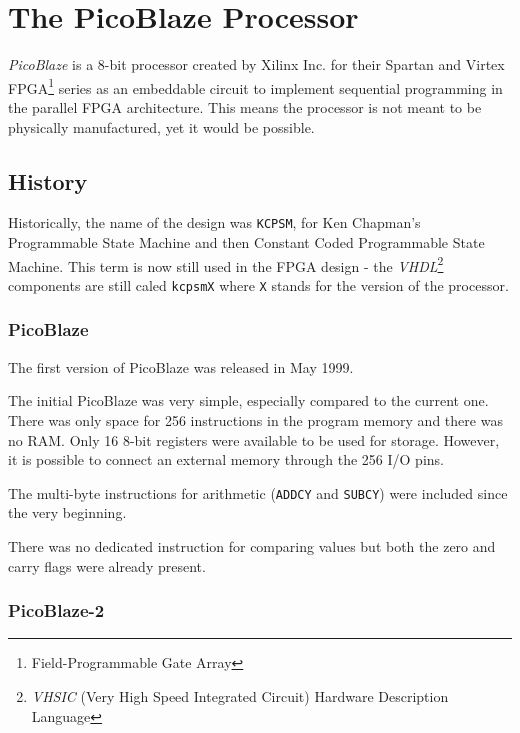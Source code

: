\chapter{The PicoBlaze Processor}\label{processor}

\emph{PicoBlaze} is a 8-bit processor created by Xilinx Inc. for their Spartan and Virtex FPGA\footnote{Field-Programmable Gate Array} series as an embeddable circuit to implement sequential programming in the parallel FPGA architecture. This means the processor is not meant to be physically manufactured, yet it would be possible.\cite{PicoBlazeWeb}

    \section{History}

    Historically, the name of the design was \texttt{KCPSM}, for Ken Chapman's Programmable State Machine and then Constant Coded Programmable State Machine. This term is now still used in the FPGA design - the \emph{VHDL}\footnote{\emph{VHSIC} (Very High Speed Integrated Circuit) Hardware Description Language} components are still caled \texttt{kcpsmX} where \texttt{X} stands for the version of the processor.\cite{DSPwFPGA}

        \subsection{PicoBlaze}

        The first version of PicoBlaze was released in May 1999.

        The initial PicoBlaze was very simple, especially compared to the current one. There was only space for 256 instructions in the program memory and there was no RAM. Only 16 8-bit registers were available to be used for storage. However, it is possible to connect an external memory through the 256 I/O pins.

        The multi-byte instructions for arithmetic (\texttt{ADDCY} and \texttt{SUBCY}) were included since the very beginning.

        There was no dedicated instruction for comparing values but both the zero and carry flags were already present.\cite{PicoBlaze}

        \subsection{PicoBlaze-2}

